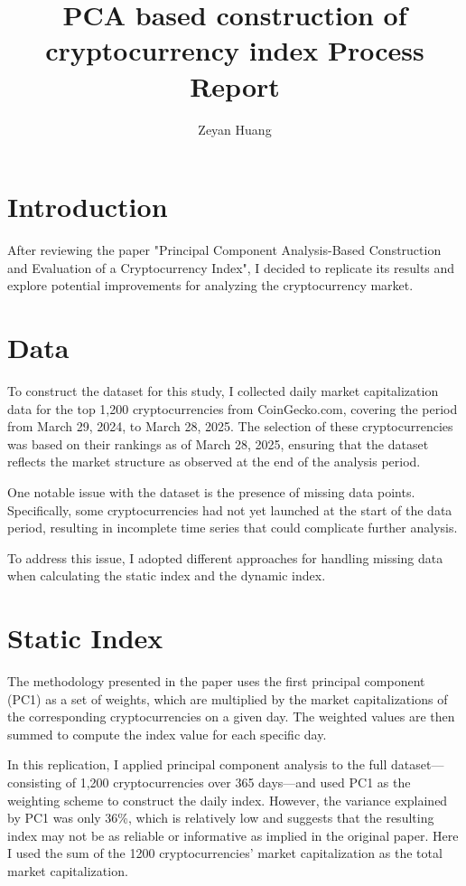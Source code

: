 \documentclass[12pt]{article}
\title{PCA based construction of cryptocurrency index Process Report}
\author{Zeyan Huang}
\date{}
\begin{document}
\maketitle

\begin{abstract}

\end{abstract}

\section{Introduction}
After reviewing the paper "Principal Component Analysis-Based Construction and Evaluation of a Cryptocurrency Index"\cite{1}, I decided to replicate its results and explore potential improvements for analyzing the cryptocurrency market.

\section{Data}
To construct the dataset for this study, I collected daily market capitalization data for the top 1,200 cryptocurrencies from CoinGecko.com, covering the period from March 29, 2024, to March 28, 2025. The selection of these cryptocurrencies was based on their rankings as of March 28, 2025, ensuring that the dataset reflects the market structure as observed at the end of the analysis period.

One notable issue with the dataset is the presence of missing data points. Specifically, some cryptocurrencies had not yet launched at the start of the data period, resulting in incomplete time series that could complicate further analysis.

To address this issue, I adopted different approaches for handling missing data when calculating the static index and the dynamic index.


\section{Static Index}
The methodology presented in the paper uses the first principal component (PC1) as a set of weights, which are multiplied by the market capitalizations of the corresponding cryptocurrencies on a given day. The weighted values are then summed to compute the index value for each specific day.

In this replication, I applied principal component analysis to the full dataset---consisting of 1,200 cryptocurrencies over 365 days---and used PC1 as the weighting scheme to construct the daily index. However, the variance explained by PC1 was only 36\%, which is relatively low and suggests that the resulting index may not be as reliable or informative as implied in the original paper.
Here I used the sum of the 1200 cryptocurrencies' market capitalization as the total market capitalization.
\end{document}
